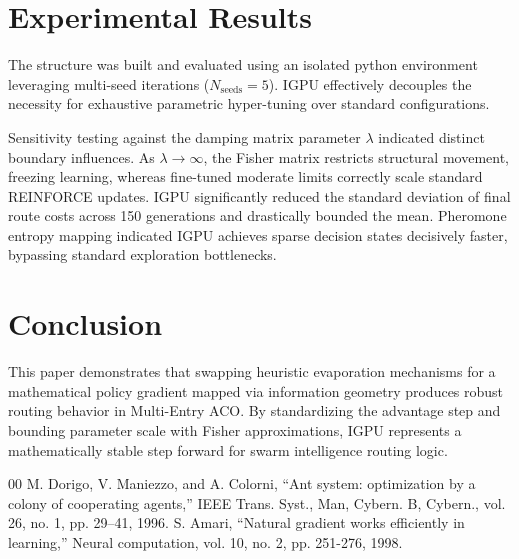 \documentclass[conference]{IEEEtran}
\begin{document}
\section{Experimental Results}

The structure was built and evaluated using an isolated python environment leveraging multi-seed iterations ($N_{\text{seeds}}=5$). IGPU effectively decouples the necessity for exhaustive parametric hyper-tuning over standard configurations.

Sensitivity testing against the damping matrix parameter $\lambda$ indicated distinct boundary influences. As $\lambda \to \infty$, the Fisher matrix restricts structural movement, freezing learning, whereas fine-tuned moderate limits correctly scale standard REINFORCE updates. IGPU significantly reduced the standard deviation of final route costs across 150 generations and drastically bounded the mean. Pheromone entropy mapping indicated IGPU achieves sparse decision states decisively faster, bypassing standard exploration bottlenecks.

\section{Conclusion}
This paper demonstrates that swapping heuristic evaporation mechanisms for a mathematical policy gradient mapped via information geometry produces robust routing behavior in Multi-Entry ACO. By standardizing the advantage step and bounding parameter scale with Fisher approximations, IGPU represents a mathematically stable step forward for swarm intelligence routing logic.

\begin{thebibliography}{00}
 M. Dorigo, V. Maniezzo, and A. Colorni, ``Ant system: optimization by a colony of cooperating agents,'' IEEE Trans. Syst., Man, Cybern. B, Cybern., vol. 26, no. 1, pp. 29--41, 1996.
 S. Amari, ``Natural gradient works efficiently in learning,'' Neural computation, vol. 10, no. 2, pp. 251-276, 1998.
\end{thebibliography}
\end{document}
